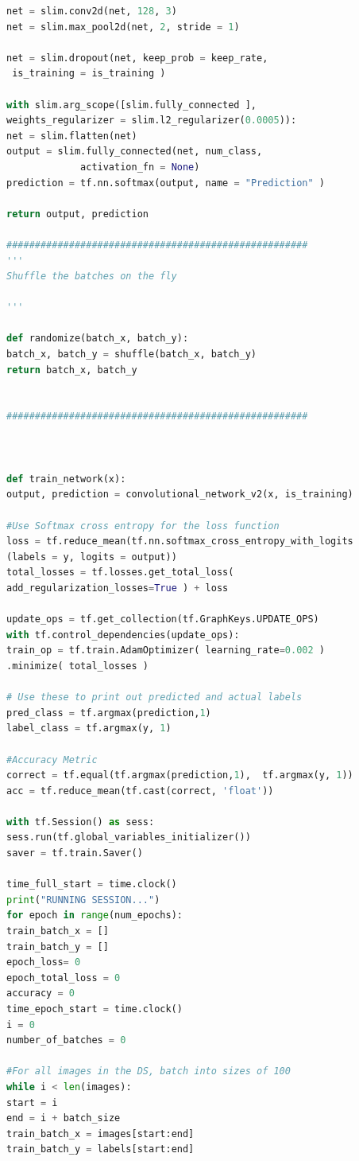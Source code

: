\begin{lstlisting}[language=python, frame=single]
net = slim.conv2d(net, 128, 3)
net = slim.max_pool2d(net, 2, stride = 1)

net = slim.dropout(net, keep_prob = keep_rate,
 is_training = is_training )

with slim.arg_scope([slim.fully_connected ], 
weights_regularizer = slim.l2_regularizer(0.0005)):
net = slim.flatten(net)
output = slim.fully_connected(net, num_class,
			 activation_fn = None)
prediction = tf.nn.softmax(output, name = "Prediction" ) 

return output, prediction

#####################################################
'''
Shuffle the batches on the fly 

'''

def randomize(batch_x, batch_y):
batch_x, batch_y = shuffle(batch_x, batch_y)
return batch_x, batch_y


#####################################################



def train_network(x):
output, prediction = convolutional_network_v2(x, is_training)

#Use Softmax cross entropy for the loss function
loss = tf.reduce_mean(tf.nn.softmax_cross_entropy_with_logits
(labels = y, logits = output))
total_losses = tf.losses.get_total_loss( 
add_regularization_losses=True ) + loss

update_ops = tf.get_collection(tf.GraphKeys.UPDATE_OPS)
with tf.control_dependencies(update_ops):
train_op = tf.train.AdamOptimizer( learning_rate=0.002 )
.minimize( total_losses )

# Use these to print out predicted and actual labels
pred_class = tf.argmax(prediction,1)
label_class = tf.argmax(y, 1)

#Accuracy Metric
correct = tf.equal(tf.argmax(prediction,1),  tf.argmax(y, 1))
acc = tf.reduce_mean(tf.cast(correct, 'float'))

with tf.Session() as sess:
sess.run(tf.global_variables_initializer())
saver = tf.train.Saver()

time_full_start = time.clock()
print("RUNNING SESSION...")
for epoch in range(num_epochs):
train_batch_x = []
train_batch_y = []
epoch_loss= 0
epoch_total_loss = 0
accuracy = 0
time_epoch_start = time.clock()
i = 0
number_of_batches = 0

#For all images in the DS, batch into sizes of 100
while i < len(images):
start = i
end = i + batch_size
train_batch_x = images[start:end]
train_batch_y = labels[start:end]


\end{lstlisting}
